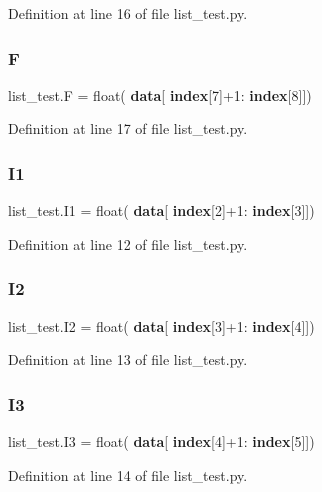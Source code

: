 Definition at line 16 of file list\+\_\+test.\+py.

\mbox{\label{namespacelist__test_ae9705fc1a20b2cef6f0e1cbf71a743a1}} 
\subsubsection{F}
{\footnotesize\ttfamily list\+\_\+test.\+F = float(\textbf{ data}[\textbf{ index}[7]+1\+:\textbf{ index}[8]])}



Definition at line 17 of file list\+\_\+test.\+py.

\mbox{\label{namespacelist__test_aaca493c4f2c32a3dced01400ce657733}} 
\subsubsection{I1}
{\footnotesize\ttfamily list\+\_\+test.\+I1 = float(\textbf{ data}[\textbf{ index}[2]+1\+:\textbf{ index}[3]])}



Definition at line 12 of file list\+\_\+test.\+py.

\mbox{\label{namespacelist__test_a90ae05ab43a554dc22f89fb00871ffd7}} 
\subsubsection{I2}
{\footnotesize\ttfamily list\+\_\+test.\+I2 = float(\textbf{ data}[\textbf{ index}[3]+1\+:\textbf{ index}[4]])}



Definition at line 13 of file list\+\_\+test.\+py.

\mbox{\label{namespacelist__test_ae958facec0f84d343f649d3cef5d7940}} 
\subsubsection{I3}
{\footnotesize\ttfamily list\+\_\+test.\+I3 = float(\textbf{ data}[\textbf{ index}[4]+1\+:\textbf{ index}[5]])}



Definition at line 14 of file list\+\_\+test.\+py.


